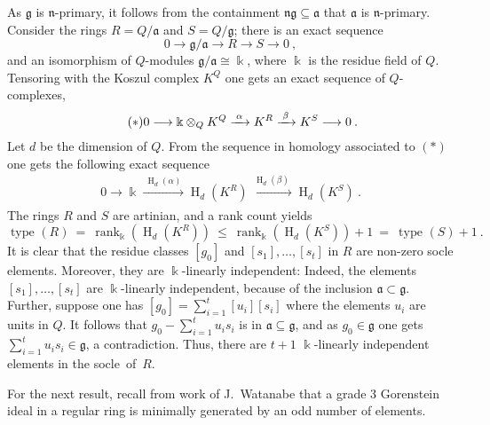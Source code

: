 \documentclass{amsart}
\theoremstyle{bfupright head,upright body}
\theoremstyle{fixed bf head,slanted body}
\theoremstyle{fixed bf head,upright body}
\theoremstyle{numbered paragraph}
\newenvironment{prf*}[1][Proof]{%
  \begin{proof}[\bf #1]
    \setcounter{equation}{0}
    \renewcommand{\theequation}{\arabic{equation}}}
  {\end{proof}
}
\newcommand{\kk}{\Bbbk}
\newcommand{\deq}{\:=\:}
\newcommand{\dle}{\:\le\:}
\renewcommand{\a}{\alpha}
\renewcommand{\b}{\beta}
\newcommand{\n}{\mathfrak{n}}
\newcommand{\is}{\cong}
\newcommand{\lra}{\longrightarrow}
\newcommand{\xra}[2][]{\xrightarrow[#1]{\;#2\;}}
\newcommand{\cls}[1]{[#1]}
\renewcommand{\H}[2][]{\operatorname{H}_{#1}(#2)}
\newcommand{\rnk}[2][k]{\operatorname{rank}_{#1}#2}
\newcommand{\type}[2][R]{\operatorname{type}_{#1}#2}
\newcommand{\tp}[3][R]{\nobreak{#2\otimes_{#1}#3}}
\newcommand{\fa}{\mathfrak{a}}
\newcommand{\fg}{\mathfrak{g}}
\numberwithin{equation}{res}
\begin{document}
\begin{prf*}
  As $\fg$ is $\n$-primary, it follows from the containment $\n
  \fg\subseteq \fa$ that $\fa$ is $\n$-primary. Consider the rings
  $R=Q/\fa$ and $S=Q/\fg$; there is an exact sequence
  \begin{equation*}
    0 \lra \fg/\fa \lra R \lra S \lra 0\:,
  \end{equation*}
  and an isomorphism of $Q$-modules $\fg/\fa\is \kk$, where $\kk$ is
  the residue field of $Q$. Tensoring with the Koszul complex $K^Q$
  one gets an exact sequence of $Q$-complexes,
  \begin{equation*}
    \tag{$\ast$}
    0 \lra \tp[Q]{\kk}{K^Q} \xra{\a} K^R \xra{\b} K^S \lra 0\:.
  \end{equation*}
  Let $d$ be the dimension of $Q$. From the sequence in homology
  associated to $(\ast)$ one gets the following exact sequence
  \begin{gather*}
    0 \lra \kk \xra{\H[d]{\a}} \H[d]{K^R} \xra{\H[d]{\b}}\H[d]{K^S}\:.
  \end{gather*}
  The rings $R$ and $S$ are artinian, and a rank count yields
  \begin{equation*}
    \type[](R) \deq \rnk[\kk]{(\H[d]{K^R})} \dle \rnk[\kk]{(\H[d]{K^S})} + 1 
    \deq \type[](S) + 1\:.
  \end{equation*}
  It is clear that the residue classes $\cls{g_0}$ and
  $\cls{s_1},\ldots,\cls{s_t}$ in $R$ are non-zero socle
  elements. Moreover, they are $\kk$-linearly independent: Indeed, the
  elements $\cls{s_1},\ldots,\cls{s_t}$ are $\kk$-linearly
  independent, because of the inclusion $\fa \subset \fg$. Further,
  suppose one has $\cls{g_0} = \sum_{i=1}^t \cls{u_i}\cls{s_i}$ where
  the elements $u_i$ are units in $Q$. It follows that
  $g_0-\sum_{i=1}^tu_is_i$ is in $\fa\subseteq \fg$, and as $g_0\in
  \fg$ one gets $\sum_{i=1}^tu_is_i \in \fg$, a contradiction.  Thus,
  there are $t + 1$ $\kk$-linearly independent elements in the
  socle~of~$R$.
\end{prf*}

For the next result, recall from work of J.~Watanabe \cite{JWt73} that
a grade 3 Gorenstein ideal in a regular ring is minimally generated by
an odd number of elements.
\end{document}
